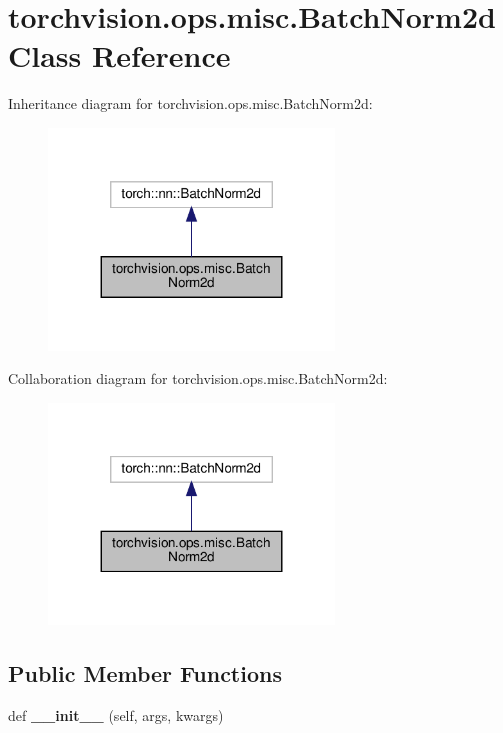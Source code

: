 \hypertarget{classtorchvision_1_1ops_1_1misc_1_1BatchNorm2d}{}\section{torchvision.\+ops.\+misc.\+Batch\+Norm2d Class Reference}
\label{classtorchvision_1_1ops_1_1misc_1_1BatchNorm2d}


Inheritance diagram for torchvision.\+ops.\+misc.\+Batch\+Norm2d\+:
\nopagebreak
\begin{figure}[H]
\begin{center}
\leavevmode
\includegraphics[width=215pt]{classtorchvision_1_1ops_1_1misc_1_1BatchNorm2d__inherit__graph}
\end{center}
\end{figure}


Collaboration diagram for torchvision.\+ops.\+misc.\+Batch\+Norm2d\+:
\nopagebreak
\begin{figure}[H]
\begin{center}
\leavevmode
\includegraphics[width=215pt]{classtorchvision_1_1ops_1_1misc_1_1BatchNorm2d__coll__graph}
\end{center}
\end{figure}
\subsection*{Public Member Functions}
\begin{DoxyCompactItemize}
\item 
\mbox{\label{classtorchvision_1_1ops_1_1misc_1_1BatchNorm2d_aeeeeabbce3ac39e1c01b2d306408047d}} 
def {\bfseries \+\_\+\+\_\+init\+\_\+\+\_\+} (self, args, kwargs)
\end{DoxyCompactItemize}



